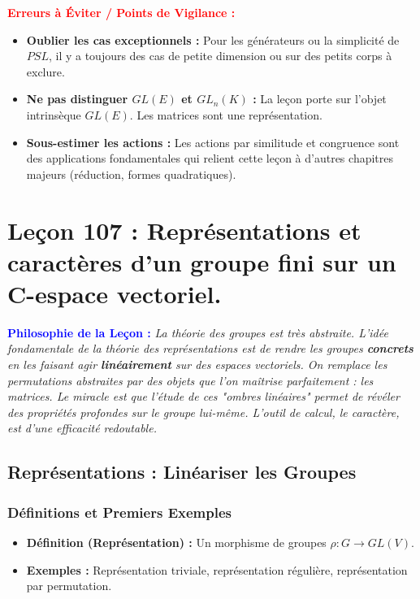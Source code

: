 \documentclass[12pt, a4paper, parskip=full]{report}
\theoremstyle{agregstyle}
\newenvironment{philosophie}
  {\par\medskip\noindent\begin{oframed}\noindent\textbf{\textcolor{blue}{Philosophie de la Leçon :}}\itshape}
  {\end{oframed}\par\medskip}
\newenvironment{erreurs}
  {\par\medskip\noindent\begin{oframed}\noindent\textbf{\textcolor{red}{Erreurs à Éviter / Points de Vigilance :}}}
  {\end{oframed}\par\medskip}
\begin{document}
\begin{erreurs}
    \begin{itemize}
        \item \textbf{Oublier les cas exceptionnels :} Pour les générateurs ou la simplicité de $PSL$, il y a toujours des cas de petite dimension ou sur des petits corps à exclure.
        \item \textbf{Ne pas distinguer $GL(E)$ et $GL_n(K)$ :} La leçon porte sur l'objet intrinsèque $GL(E)$. Les matrices sont une représentation.
        \item \textbf{Sous-estimer les actions :} Les actions par similitude et congruence sont des applications fondamentales qui relient cette leçon à d'autres chapitres majeurs (réduction, formes quadratiques).
    \end{itemize}
\end{erreurs}

\newpage
\chapter{Leçon 107 : Représentations et caractères d'un groupe fini sur un C-espace vectoriel.}

\begin{philosophie}
    La théorie des groupes est très abstraite. L'idée fondamentale de la théorie des représentations est de rendre les groupes \textbf{concrets} en les faisant agir \textbf{linéairement} sur des espaces vectoriels. On remplace les permutations abstraites par des objets que l'on maîtrise parfaitement : les matrices. Le miracle est que l'étude de ces "ombres linéaires" permet de révéler des propriétés profondes sur le groupe lui-même. L'outil de calcul, le caractère, est d'une efficacité redoutable.
\end{philosophie}

\section{Représentations : Linéariser les Groupes}
\subsection{Définitions et Premiers Exemples}
\begin{itemize}
    \item \textbf{Définition (Représentation) :} Un morphisme de groupes $\rho: G \to GL(V)$.
    \item \textbf{Exemples :} Représentation triviale, représentation régulière, représentation par permutation.
\end{itemize}
\end{document}
